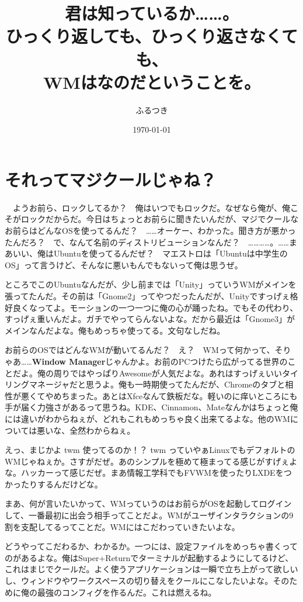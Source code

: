 \documentclass[12pt,a4paper]{jsarticle}
\title{君は知っているか……。\\ひっくり返しても、ひっくり返さなくても、\\WMは\rotatebox[origin=c]{180}{WM}なのだということを。}
\author{ふるつき}
\date{\today}
\begin{document}
\maketitle
\section{それってマジクールじゃね？}
　ようお前ら、ロックしてるか？　俺はいつでもロックだ。なぜなら俺が、俺こそがロックだからだ。今日はちょっとお前らに聞きたいんだが、マジでクールなお前らはどんなOSを使ってるんだ？　……オーケー、わかった。聞き方が悪かったんだろ？　で、なんて名前のディストリビューションなんだ？　…………。……まあいい、俺はUbuntuを使ってるんだぜ？　マエストロは「Ubuntuは中学生のOS」って言うけど、そんなに悪いもんでもないって俺は思うぜ。
 
 ところでこのUbuntuなんだが、少し前までは「Unity」っていうWMがメインを張ってたんだ。その前は「Gnome2」ってやつだったんだが、Unityですっげぇ格好良くなってよ。モーションの一つ一つに俺の心が踊ったね。でもその代わり、すっげぇ重いんだよ。ガチでやってらんないよな。だから最近は「Gnome3」がメインなんだよな。俺もめっちゃ使ってる。文句なしだね。
 
 お前らのOSではどんなWMが動いてるんだ？　え？　WMって何かって、そりゃあ……\textbf{Window Manager}じゃんかよ。お前のPCつけたら広がってる世界のことだよ。俺の周りではやっぱりAwesomeが人気だよな。あれはすっげぇいいタイリングマネージャだと思うよ。俺も一時期使ってたんだが、Chromeのタブと相性が悪くてやめちまった。あとはXfceなんて鉄板だな。軽いのに痒いところにも手が届く力強さがあるって思うね。KDE、Cinnamon、Mateなんかはちょっと俺には違いがわからねぇが、どれもこれもめっちゃ良く出来てるよな。他のWMについては悪いな、全然わからねぇ。
 
 えっ、まじかよ twm 使ってるのか！？ twm っていやぁLinuxでもデフォルトのWMじゃねぇか。さすがだぜ。あのシンプルを極めて極まってる感じがすげぇよな。ハッカーって感じだぜ。まあ情報工学科でもFVWMを使ったりLXDEをつかったりするんだけどな。

 まあ、何が言いたいかって、WMっていうのはお前らがOSを起動してログインして、一番最初に出会う相手ってことだよ。WMがユーザインタラクションの9割を支配してるってことだ。WMにはこだわっていきたいよな。
 
 どうやってこだわるか、わかるか。一つには、設定ファイルをめっちゃ書くってのがあるよな。俺はSuper+Returnでターミナルが起動するようにしてるけど、これはまじでクールだ。よく使うアプリケーションは一瞬で立ち上がって欲しいし、ウィンドウやワークスペースの切り替えをクールにこなしたいよな。そのために俺の最強のコンフィグを作るんだ。これは燃えるね。
 
\end{document}

